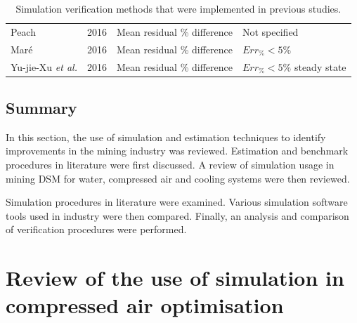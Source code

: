 \begin{table}[h]
\begin{tabular}{p{4cm}ccl}
			Peach \cite{Peach2016Masters}						& 2016 & Mean residual \% difference & Not specified\\
 			Maré \cite{Mare2016PhD} 							& 2016 & Mean residual \% difference & $Err_{\%} <5\%$  \\	
 			Yu-jie-Xu \textit{et al.} \cite{xu2016modeling}		& 2016 & Mean residual \% difference & $Err_{\%} <5\%$ steady state \\
 			\hline
 		\end{tabular} 
 		\caption{Simulation verification methods that were implemented in previous studies.}
 		\label{table: Verification studies}
 	\end{table}
 

 	\subsection{Summary}
 	In this section, the use of simulation and estimation techniques to identify improvements in the mining industry was reviewed. Estimation and benchmark procedures in literature were first discussed. A review of simulation usage in mining DSM for water, compressed air and cooling systems were then reviewed.
 	
 	Simulation procedures in literature were examined. Various simulation software tools used in industry were then compared. Finally, an analysis and comparison of verification procedures were performed.
 	\clearpage
\section{Review of the use of simulation in compressed air optimisation}
\label{CompressorSimulation Literature} \label{simplfiedModels}
